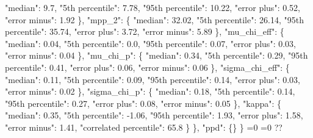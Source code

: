 {{          "median": 9.7, %
          "5th percentile": 7.78, %
          "95th percentile": 10.22, %
          "error plus": 0.52, %
          "error minus": 1.92%
        \}, %
        "mpp\_2": \{%
          "median": 32.02, %
          "5th percentile": 26.14, %
          "95th percentile": 35.74, %
          "error plus": 3.72, %
          "error minus": 5.89%
        \}, %
        "mu\_chi\_eff": \{%
          "median": 0.04, %
          "5th percentile": 0.0, %
          "95th percentile": 0.07, %
          "error plus": 0.03, %
          "error minus": 0.04%
        \}, %
        "mu\_chi\_p": \{%
          "median": 0.34, %
          "5th percentile": 0.29, %
          "95th percentile": 0.41, %
          "error plus": 0.06, %
          "error minus": 0.06%
        \}, %
        "sigma\_chi\_eff": \{%
          "median": 0.11, %
          "5th percentile": 0.09, %
          "95th percentile": 0.14, %
          "error plus": 0.03, %
          "error minus": 0.02%
        \}, %
        "sigma\_chi\_p": \{%
          "median": 0.18, %
          "5th percentile": 0.14, %
          "95th percentile": 0.27, %
          "error plus": 0.08, %
          "error minus": 0.05%
        \}, %
        "kappa": \{%
          "median": 0.35, %
          "5th percentile": {-}1.06, %
          "95th percentile": 1.93, %
          "error plus": 1.58, %
          "error minus": 1.41, %
          "correlated percentile": 65.8%
        \}%
      \}, %
      "ppd": \{\}%
    \}}%
  \else%
    \ifnum{}=0%
      \let\mchieffCopulaCorrelationModel@out\mchieffCopulaCorrelationModel@I%
    \else%
      \ifnum{}=0%
      \let\mchieffCopulaCorrelationModel@out\mchieffCopulaCorrelationModel@II%
    \else%
      \def\mchieffCopulaCorrelationModel@out{%
    ??}%
    \fi\fi
  \fi
  \mchieffCopulaCorrelationModel@out
}\newcommand\mchieffCopulaCorrelationModel@I[1][all]{%
  \ifnum\pdfstrcmp{#1}{all}=0%
    \def\mchieffCopulaCorrelationModel@I@out{%
    \{%
      "alpha\_1": \{%
        "median": 1.91, %
        "5th percentile": {-}0.11, %
        "95th percentile": 3.36, %
        "error plus": 1.45, %
        "error minus": 2.02%
      \}, %
      "alpha\_2": \{%
        "median": 4.59, %
        "5th percentile": 3.16, %
        "95th percentile": 6.24, %
        "error plus": 1.65, %
        "error minus": 1.44%
      \}, %
      "beta": \{%
        "median": 1.22, %
        "5th percentile": 0.18, %
        "95th percentile": 2.53, %
        "error plus": 1.31, %
        "error minus": 1.04%
      \}, %
      "break\_mass": \{%
        "median": 35.74, %
}}
